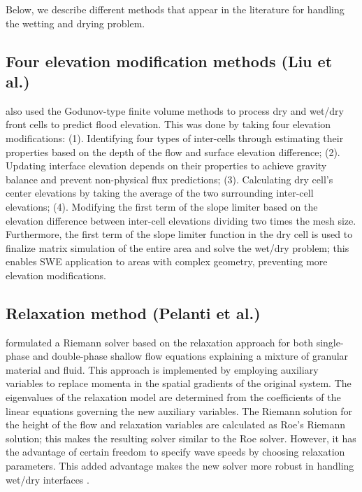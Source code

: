 \documentclass[9pt,a4paper]{article}
\begin{document}
	Below, we describe different methods that appear in the literature for handling the wetting and drying problem.
	
	\subsection{Four elevation modification  methods (Liu et al.)}
	\citet{li-ta-wa-ca-ba-ch-li:2021} also used the Godunov-type finite volume methods to process dry and wet/dry front cells to predict flood elevation. This was done by taking four elevation modifications: (1).  Identifying four types of inter-cells through estimating their properties based on the depth of the flow and surface elevation difference; (2). Updating interface elevation depends on their properties to achieve gravity balance and prevent non-physical flux predictions;  (3).  Calculating dry cell's center elevations by taking the average of the two surrounding inter-cell elevations; (4). Modifying the first term of the slope limiter based on the elevation difference between inter-cell elevations dividing two times the mesh size. Furthermore, the first term of the slope limiter function in the dry cell is used to finalize matrix simulation of the entire area and solve the wet/dry problem; this enables SWE application to areas with complex geometry, preventing more elevation modifications.
	
	\subsection{Relaxation method (Pelanti et al.)}
	
	\citet{pelanti2011riemann} formulated a Riemann solver based on the relaxation approach for both single-phase and double-phase shallow flow equations explaining a mixture of granular material and fluid. This approach is implemented by employing auxiliary variables to replace momenta in the spatial gradients of the original system. The eigenvalues of the relaxation model are determined from the coefficients of the linear equations governing the new auxiliary variables.  The Riemann solution for the height of the flow and relaxation variables are calculated as Roe's Riemann solution; this makes the resulting solver similar to the Roe solver. However, it has the advantage of certain freedom to specify wave speeds by choosing relaxation parameters. This added advantage makes the new solver more robust in handling wet/dry interfaces \citep{pelanti2008relaxation,pelanti2011riemann}.
	
\end{document}
